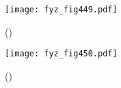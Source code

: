     \begin{figure}[ht!] %
      \centering
      \texttt{[image: fyz\_fig449.pdf]}
      \caption{ 
               (\cite[s.~707]{Feynman01})}
      \label{fyz_fig449}
    \end{figure}

    \begin{figure}[ht!] %
      \centering
      \texttt{[image: fyz\_fig450.pdf]}
      \caption{ 
               (\cite[s.~707]{Feynman01})}
      \label{fyz_fig450}
    \end{figure}

\printbibliography[title={Seznam literatury}, heading=subbibliography]

